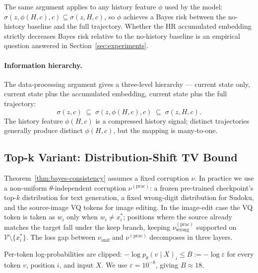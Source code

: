 \documentclass{llmxive}
\providecommand{\temporalmethod}{HR\xspace}
\providecommand{\xstar}{x^{\ast}}
\begin{document}
The same argument applies to any history feature $\phi$ used by the model: $\sigma(z, \phi(H, c), c) \subseteq \sigma(z, H, c)$, so $\phi$ achieves a Bayes risk between the no-history baseline and the full trajectory. Whether the \temporalmethod accumulated embedding strictly decreases Bayes risk relative to the no-history baseline is an empirical question answered in Section~\ref{sec:experiments}.

\paragraph{Information hierarchy.}
The data-processing argument gives a three-level hierarchy --- current state only, current state plus the accumulated embedding, current state plus the full trajectory:
\[
\sigma\!\left(z, c\right) \;\subseteq\; \sigma\!\left(z, \phi(H, c), c\right) \;\subseteq\; \sigma\!\left(z, H, c\right).
\]
The history feature $\phi(H, c)$ is a compressed history signal; distinct trajectories generally produce distinct $\phi(H, c)$, but the mapping is many-to-one.

\subsection{Top-k Variant: Distribution-Shift TV Bound}
\label{app:topk-tv-gap}

Theorem~\ref{thm:bayes-consistency} assumes a fixed corruption $\nu$. In practice we use a non-uniform $\theta$-independent corruption $\nu^{(\mathrm{prac})}$: a frozen pre-trained checkpoint's top-$k$ distribution for text generation, a fixed wrong-digit distribution for Sudoku, and the source-image VQ tokens for image editing. In the image-edit case the VQ token is taken as $w_i$ only when $w_i \neq \xstar_i$; positions where the source already matches the target fall under the keep branch, keeping $\nu^{(\mathrm{prac})}_{\mathrm{wrong}}$ supported on $\mathcal{V} \setminus \{\xstar_i\}$. The loss gap between $\nu_{\mathrm{unif}}$ and $\nu^{(\mathrm{prac})}$ decomposes in three layers.

\begin{assumption}
\label{ass:bounded-rm}
Per-token log-probabilities are clipped: $-\log p_\theta(v \mid X)_i \leq B := -\log\varepsilon$ for every token $v$, position $i$, and input $X$. We use $\varepsilon = 10^{-8}$, giving $B \approx 18$.
\end{assumption}
\end{document}
